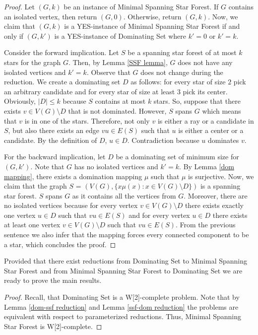 \documentclass[en]{pracamgr}
\theoremstyle{definition}
\newcommand{\mssfp}{{\sc Minimal Spanning Star Forest}}
\newcommand{\domsetp}{{\sc Dominating Set}}
\begin{document}
\begin{proof}
	Let $(G,k)$ be an instance of \mssfp{}. If $G$ contains an isolated vertex, then return $(G,0)$. Otherwise, return $(G,k)$. Now, we claim that $(G,k)$ is a YES-instance of \mssfp{} if and only if $(G,k')$ is a YES-instance of \domsetp{} where $k'=0$ or $k'=k$.
	
	Consider the forward implication. Let $S$ be a spanning star forest of at most $k$ stars for the graph $G$. Then, by Lemma \ref{SSF lemma}, $G$ does not have any isolated vertices and $k'=k$. Observe that $G$ does not change during the reduction. We create a dominating set $D$ as follows: for every star of size $2$ pick an arbitrary candidate and for every star of size at least $3$ pick its center. Obviously, $|D| \leq k$ because $S$ contains at most $k$ stars. So, suppose that there exists $v \in V(G) \setminus D$ that is not dominated. However, $S$ spans $G$ which means that $v$ is in one of the stars. Therefore, not only $v$ is either a ray or a candidate in $S$, but also there exists an edge $vu \in E(S)$ such that $u$ is either a center or a candidate. By the definition of $D$, $u \in D$. Contradiction because $u$ dominates $v$.
	
	For the backward implication, let $D$ be a dominating set of minimum size for $(G,k')$. Note that $G$ has no isolated vertices and $k'=k$. By Lemma \ref{dom mapping}, there exists a domination mapping $\mu$ such that $\mu$ is surjective. Now, we claim that the graph $S$ = $(V(G), \{x\mu(x): x \in V(G) \setminus D\})$ is a spanning star forest. $S$ spans $G$ as it contains all the vertices from $G$. Moreover, there are no isolated vertices because for every vertex $v \in V(G) \setminus D$ there exists exactly one vertex $u \in D$ such that $vu \in E(S)$ and for every vertex $u \in D$ there exists at least one vertex $v \in V(G) \setminus D$ such that $vu \in E(S)$. From the previous sentence we also infer that the mapping forces every connected component to be a star, which concludes the proof.
\end{proof}

Provided that there exist reductions from \domsetp{} to \mssfp{} and from \mssfp{} to \domsetp{} we are ready to prove the main results.

\thmmssfpwc*

\begin{proof}
	Recall, that \domsetp{} is a W[2]-complete problem. Note that by Lemma \ref{dom-ssf reduction} and Lemma \ref{ssf-dom reduction} the problems are equivalent with respect to parameterized reductions. Thus, \mssfp{} is W[2]-complete.
\end{proof}
\end{document}
